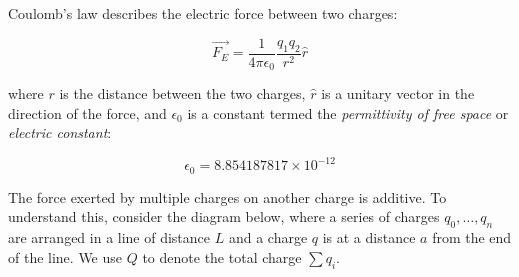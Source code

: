 \documentclass[12pt]{article}
\theoremstyle{definition}
\begin{document}
Coulomb's law describes the electric force between two charges:

\begin{equation}\tag{Coloumb's law}
    \vec{F_E} = \frac{1}{4\pi \epsilon_0} \frac{ q_1q_2 }{r^2} \hat{r}
\end{equation}

where $r$ is the distance between the two charges, $\hat{r}$ is a unitary vector
in the direction of the force, and $\epsilon_0$ is a constant termed the
\textit{permittivity of free space} or \textit{electric constant}:

\begin{equation*}
\epsilon_0 = 8.854 187 817 \times 10^{−12} \tag{Permittivity of free space}
\end{equation*}

The force exerted by multiple charges on another charge is additive. To
understand this, consider the diagram below, where a series of charges $q_0,
\ldots, q_n$ are arranged in a line of distance $L$ and a charge $q$ is at a
distance $a$ from the end of the line. We use $Q$ to denote the total charge 
$\sum q_i$.


\begin{center}
    
\end{center}
\end{document}
